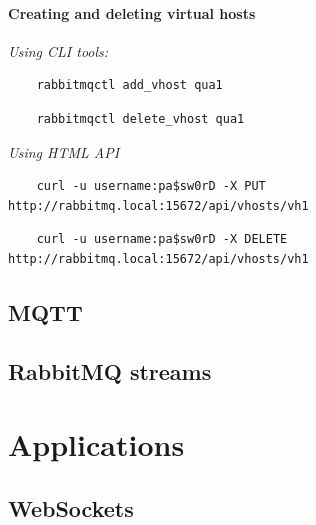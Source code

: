 \documentclass[4paper,12pt]{article}
\begin{document}
\paragraph*{Creating and deleting virtual hosts\\}
\textit{Using CLI tools:\\}
\begin{lstlisting}
    rabbitmqctl add_vhost qua1
\end{lstlisting}

\begin{lstlisting}
    rabbitmqctl delete_vhost qua1
\end{lstlisting}

\textit{Using HTML API\\}
\begin{lstlisting}
    curl -u username:pa$sw0rD -X PUT http://rabbitmq.local:15672/api/vhosts/vh1
\end{lstlisting}

\begin{lstlisting}
    curl -u username:pa$sw0rD -X DELETE http://rabbitmq.local:15672/api/vhosts/vh1
\end{lstlisting}

\subsection*{MQTT}

\subsection*{RabbitMQ streams}
\justify{}

\section*{Applications}

\subsection*{WebSockets}
\justify{}
\end{document}
